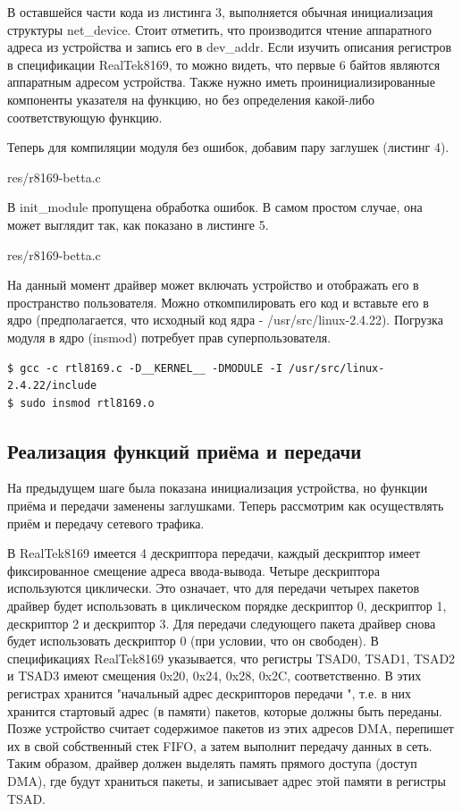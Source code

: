 В оставшейся части кода из листинга 3, выполняется обычная инициализация структуры net\_device. Стоит отметить, что производится чтение аппаратного адреса из устройства и запись его в dev\_addr. Если изучить описания регистров в спецификации RealTek8169, то можно видеть, что первые 6 байтов являются аппаратным адресом устройства. Также нужно иметь проинициализированные компоненты указателя на функцию, но без определения какой-либо соответствующую функцию.

Теперь для компиляции модуля без ошибок, добавим пару заглушек (листинг 4).


{res/r8169-betta.c}

В init\_module пропущена обработка ошибок. В самом простом случае, она может выглядит так, как показано в листинге 5.


{res/r8169-betta.c}

На данный момент драйвер может включать устройство и отображать его в пространство пользователя. Можно откомпилировать его код и вставьте его в ядро (предполагается, что исходный код ядра - /usr/src/linux-2.4.22). Погрузка модуля в ядро (insmod) потребует прав суперпользователя.

\begin{Verbatim}[frame=single]
$ gcc -c rtl8169.c -D__KERNEL__ -DMODULE -I /usr/src/linux-2.4.22/include
$ sudo insmod rtl8169.o
\end{Verbatim}

\newpage
\subsection{Реализация функций приёма и передачи}

На предыдущем шаге была показана инициализация устройства, но функции приёма и передачи заменены заглушками. Теперь рассмотрим как осуществлять приём и передачу сетевого трафика.

В RealTek8169 имеется 4 дескриптора передачи, каждый дескриптор имеет фиксированное смещение адреса ввода-вывода\cite{Realtech}. Четыре дескриптора используются циклически. Это означает, что для передачи четырех пакетов драйвер будет использовать в циклическом порядке дескриптор 0, дескриптор 1, дескриптор 2 и дескриптор 3. Для передачи следующего пакета драйвер снова будет использовать дескриптор 0 (при условии, что он свободен). В спецификациях RealTek8169 указывается, что регистры TSAD0, TSAD1, TSAD2 и TSAD3 имеют смещения 0x20, 0x24, 0x28, 0x2C, соответственно. В этих регистрах хранится "начальный адрес дескрипторов передачи ", т.е. в них хранится стартовый адрес (в памяти) пакетов, которые должны быть переданы. Позже устройство считает содержимое пакетов из этих адресов DMA, перепишет их в свой собственный стек FIFO, а затем выполнит передачу данных в сеть. Таким образом, драйвер должен выделять память прямого доступа (доступ DMA), где будут храниться пакеты, и записывает адрес этой памяти в регистры TSAD.

